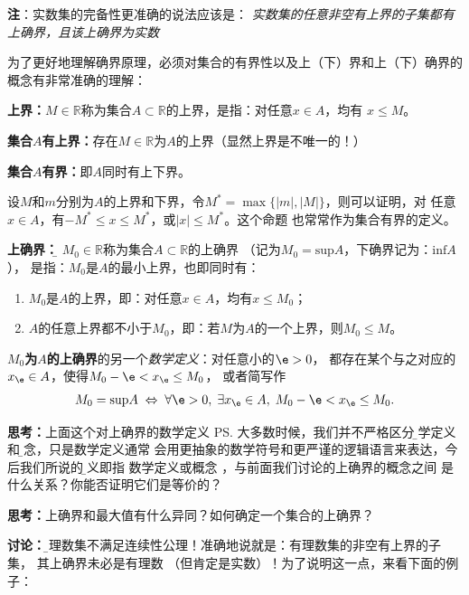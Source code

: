 	  {\bf 注}：实数集的完备性更准确的说法应该是：
	  {\it 实数集的任意非空有上界的子集都有上确界，且该上确界为实数}
	
	为了更好地理解确界原理，必须对集合的有界性以及上（下）界和上（下）确界的概念有非常准确的理解：
	
	\begin{thx}
		{\bf 上界：}$M\in\mathbb{R}$称为集合$A\subset\mathbb{R}$的上界，是指：对任意$x\in A$，均有
		$x\leq M$。
		
		{\bf 集合$A$有上界：}存在$M\in\mathbb{R}$为$A$的上界（显然上界是不唯一的！）
		
		{\bf 集合$A$有界：}即$A$同时有上下界。
	\end{thx}	
	
		设$M$和$m$分别为$A$的上界和下界，令$M^*=\max\{|m|,|M|\}$，则可以证明，对
		任意$x\in A$，有$-M^*\leq x\leq M^*$，或$|x|\leq M^*$。这个命题
		也常常作为集合有界的定义。
	\begin{thx}
		{\bf 上确界：}{\b
		$M_0\in\mathbb{R}$称为集合$A\subset\mathbb{R}$的上确界
		（记为$M_0=\mathrm{sup}A$，下确界记为：$\mathrm{inf}A$），
		是指：$M_0$是$A$的最小上界}，也即同时有：
		\begin{enumerate}[(1)]
		  \setlength{\itemindent}{1cm}
		  \item $M_0$是$A$的上界，即：对任意$x\in A$，均有$x\leq M_0$；
		  \item $A$的任意上界都不小于$M_0$，即：若$M$为$A$的一个上界，则$M_0\leq M$。
		\end{enumerate}
		{\bf $M_0$为$A$的上确界}的另一个{\it 数学定义}：对任意小的$\e>0$，
		都存在某个与之对应的$x_{\e}\in A$，使得$M_0-\e<x_{\e}\leq M_0$，
		或者简写作
		$$M_0=\mathrm{sup}A\;\Leftrightarrow\;
		\forall\e>0,\;\exists x_{\e}\in A,\;M_0-\e<x_{\e}\leq M_0.$$
	\end{thx}

	{\bf 思考：}上面这个对上确界的数学定义
	\ps{大多数时候，我们并不严格区分{\b 数学定义}和{\b 概念}，只是数学定义通常
	会用更抽象的数学符号和更严谨的逻辑语言来表达，今后我们所说的{\b 定义}即指
	数学定义或概念}
	，与前面我们讨论的上确界的概念之间	是什么关系？你能否证明它们是等价的？
	
	{\bf 思考：}上确界和最大值有什么异同？如何确定一个集合的上确界？
	
	{\bf 讨论：}{\b 有理数集不满足连续性公理！}准确地说就是：有理数集的非空有上界的子集，
	其上确界未必是有理数	（但肯定是实数）！为了说明这一点，来看下面的例子：
	
